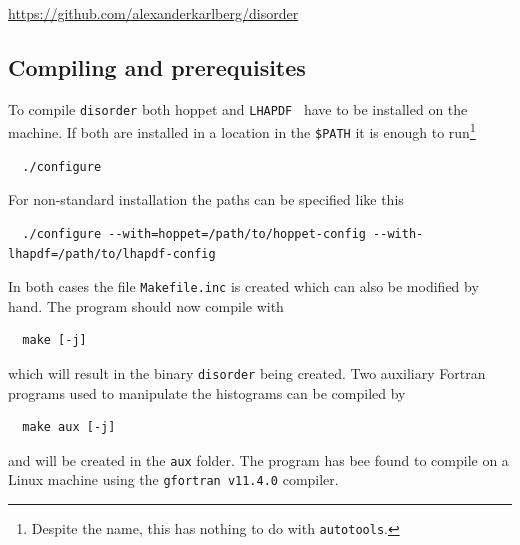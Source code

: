 \documentclass[submission, PhysCodeb]{SciPost}
\newcommand{\hoppet}{{\sc hoppet}}
\newcommand{\disorder}{{\tt disorder}}
\newcommand{\lhapdf}{{\tt LHAPDF}}
\begin{document}
\begin{center}\url{https://github.com/alexanderkarlberg/disorder}\end{center}

\subsection{Compiling and prerequisites}
To compile \disorder{} both \hoppet{} and
\lhapdf{}~\cite{Buckley:2014ana} have to be installed on the
machine. If both are installed in a location in the {\tt \$PATH} it is
enough to run\footnote{Despite the name, this has nothing to do with
{\tt autotools}.}
\begin{lstlisting}
  ./configure
\end{lstlisting}
For non-standard installation the paths can be specified like this
\begin{lstlisting}
  ./configure --with=hoppet=/path/to/hoppet-config --with-lhapdf=/path/to/lhapdf-config
\end{lstlisting}
In both cases the file {\tt Makefile.inc} is created which can also be
modified by hand. The program should now compile with
\begin{lstlisting}
  make [-j]
\end{lstlisting}
which will result in the binary \disorder{} being created. Two
auxiliary Fortran programs used to manipulate the histograms can be
compiled by
\begin{lstlisting}
  make aux [-j]
\end{lstlisting}
and will be created in the {\tt aux} folder. The program has bee found
to compile on a Linux machine using the {\tt gfortran v11.4.0}
compiler.
\end{document}
